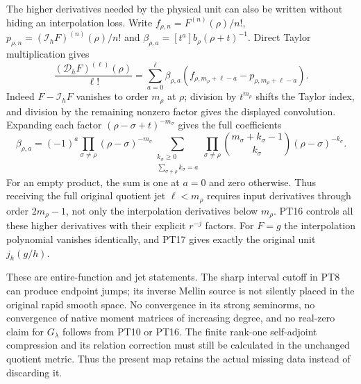 \documentclass[11pt]{article}
\begin{document}
The higher derivatives needed by the physical unit can also be
written without hiding an interpolation loss. Write
$f_{\rho,n}=F^{(n)}(\rho)/n!$,
$p_{\rho,n}=(\mathcal I_hF)^{(n)}(\rho)/n!$ and
$\beta_{\rho,a}=[t^a]b_\rho(\rho+t)^{-1}$. Direct Taylor
multiplication gives
\begin{equation}\tag{PT17}
 \frac{(\mathcal D_hF)^{(\ell)}(\rho)}{\ell!}
   =\sum_{a=0}^{\ell}\beta_{\rho,a}
           (f_{\rho,m_\rho+\ell-a}-p_{\rho,m_\rho+\ell-a}).
\end{equation}
Indeed $F-\mathcal I_hF$ vanishes to order $m_\rho$ at
$\rho$; division by $t^{m_\rho}$ shifts the Taylor index, and
division by the remaining nonzero factor gives the displayed
convolution. Expanding each factor
$(\rho-\sigma+t)^{-m_\sigma}$ gives the full coefficients
\begin{equation}\tag{PT18}
 \beta_{\rho,a}=(-1)^a
   \prod_{\sigma\ne\rho}(\rho-\sigma)^{-m_\sigma}
   \sum_{\substack{k_\sigma\ge0\\\sum_{\sigma\ne\rho}k_\sigma=a}}
     \prod_{\sigma\ne\rho}
       \binom{m_\sigma+k_\sigma-1}{k_\sigma}
                      (\rho-\sigma)^{-k_\sigma}.
\end{equation}
For an empty product, the sum is one at $a=0$ and zero otherwise.
Thus receiving the full original quotient jet $\ell<m_\rho$
requires input derivatives through order $2m_\rho-1$, not only
the interpolation derivatives below $m_\rho$. PT16 controls all
these higher derivatives with their explicit $r^{-j}$ factors.
For $F=g$ the interpolation polynomial vanishes identically, and
PT17 gives exactly the original unit $j_h(g/h)$.

These are entire-function and jet statements. The sharp interval
cutoff in PT8 can produce endpoint jumps; its inverse Mellin
source is not silently placed in the original rapid smooth space.
No convergence in its strong seminorms, no convergence of native
moment matrices of increasing degree, and no real-zero claim for
$G_\lambda$ follows from PT10 or PT16. The finite rank-one
self-adjoint compression and its relation correction must still
be calculated in the unchanged quotient metric. Thus the present
map retains the actual missing data instead of discarding it.
\end{document}
